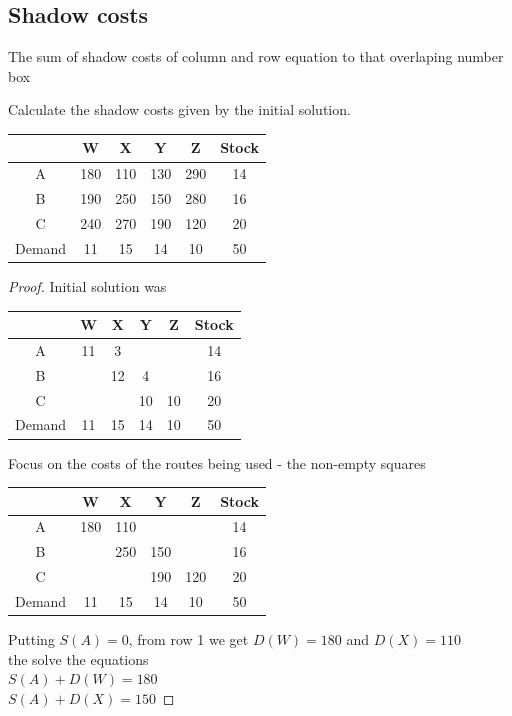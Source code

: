 \documentclass[a4paper]{article}
\begin{document}
\subsection{Shadow costs}
\begin{defi}
	The sum of shadow costs of column and row equation to that overlaping number box
\end{defi}
\begin{eg}
	Calculate the shadow costs given by the initial solution.
	\begin{center}
		\begin{tabular}{|c|c|c|c|c|c|}
			\hline
			       & W   & X   & Y   & Z   & Stock \\
			\hline
			A      & 180 & 110 & 130 & 290 & 14    \\
			\hline
			B      & 190 & 250 & 150 & 280 & 16    \\
			\hline
			C      & 240 & 270 & 190 & 120 & 20    \\
			\hline
			Demand & 11  & 15  & 14  & 10  & 50    \\
			\hline
		\end{tabular}
	\end{center}
	\begin{proof}
		Initial solution was
		\begin{center}
			\begin{tabular}{|c|c|c|c|c|c|}
				\hline
				       & W  & X  & Y  & Z  & Stock \\
				\hline
				A      & 11 & 3  &    &    & 14    \\
				\hline
				B      &    & 12 & 4  &    & 16    \\
				\hline
				C      &    &    & 10 & 10 & 20    \\
				\hline
				Demand & 11 & 15 & 14 & 10 & 50    \\
				\hline
			\end{tabular}
		\end{center}
		Focus on the costs of the routes being used - the non-empty squares
		\begin{center}
			\begin{tabular}{|c|c|c|c|c|c|}
				\hline
				       & W   & X   & Y   & Z   & Stock \\
				\hline
				A      & 180 & 110 &     &     & 14    \\
				\hline
				B      &     & 250 & 150 &     & 16    \\
				\hline
				C      &     &     & 190 & 120 & 20    \\
				\hline
				Demand & 11  & 15  & 14  & 10  & 50    \\
				\hline
			\end{tabular}
		\end{center}
		Putting $S(A)=0$, from row 1 we get $D(W)=180$ and $D(X)=110$\\
		the solve the equations \\
		$S(A)+D(W)=180$\\
		$S(A)+D(X)=150$


\end{proof}
\end{eg}
\end{document}
